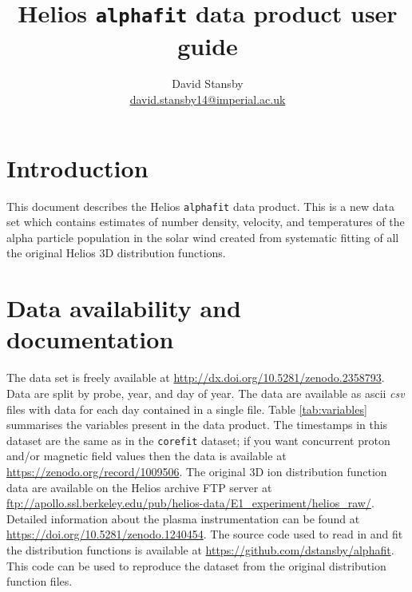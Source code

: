 \documentclass[11pt,a4paper]{article}
\begin{document}
\title{Helios \texttt{alphafit} data product user guide}
\author{David Stansby \\
\href{mailto:david.stansby14@imperial.ac.uk}{david.stansby14@imperial.ac.uk}}
\maketitle

\section{Introduction}
This document describes the Helios \texttt{alphafit} data product. This is a new data set which contains estimates of number density, velocity, and temperatures of the alpha particle population in the solar wind created from systematic fitting of all the original Helios 3D distribution functions.

\section{Data availability and documentation}
The data set is freely available at \url{http://dx.doi.org/10.5281/zenodo.2358793}.
\newline
\newline
Data are split by probe, year, and day of year. The data are available as ascii \emph{csv} files with data for each day contained in a single file. Table \ref{tab:variables} summarises the variables present in the data product.
\newline
\newline
The timestamps in this dataset are the same as in the \texttt{corefit} dataset; if you want concurrent proton and/or magnetic field values then the data is available at \url{https://zenodo.org/record/1009506}.
\newline
\newline
The original 3D ion distribution function data are available on the Helios archive FTP server at \url{ftp://apollo.ssl.berkeley.edu/pub/helios-data/E1_experiment/helios_raw/}. Detailed information about the plasma instrumentation can be found at \url{https://doi.org/10.5281/zenodo.1240454}. The source code used to read in and fit the distribution functions is available at \url{https://github.com/dstansby/alphafit}. This code can be used to reproduce the dataset from the original distribution function files.
\end{document}

